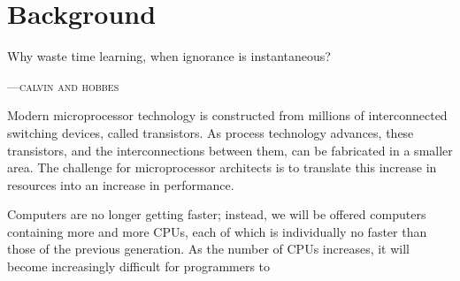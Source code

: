 %
%
%
%

\chapter{Background}
\epigraph{Why waste time learning, when ignorance is instantaneous?}
{\textsc{---calvin and hobbes}}

%
%
%


Modern microprocessor technology is constructed from millions of interconnected
switching devices, called transistors. As process technology advances, these
transistors, and the interconnections between them, can be fabricated in a
smaller area. The challenge for microprocessor architects is to translate this
increase in resources into an increase in performance.

Computers are no longer getting faster; instead, we will be offered computers
containing more and more CPUs, each of which is individually no faster than
those of the previous generation. As the number of CPUs increases, it will
become increasingly difficult for programmers to 

